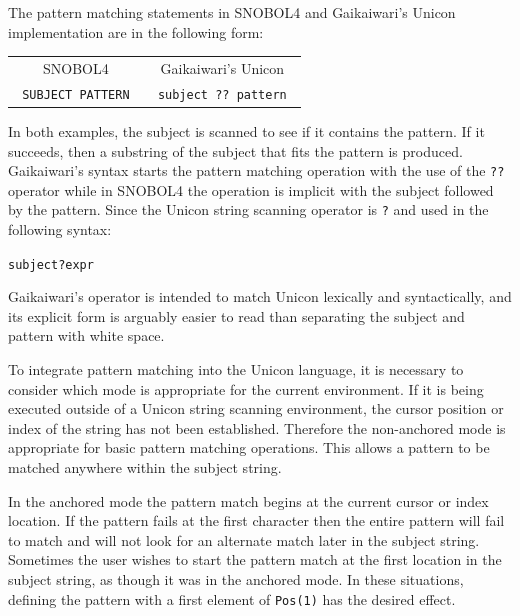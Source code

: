 \documentclass{article}
\begin{document}
\pagebreak
The pattern matching statements in SNOBOL4 and Gaikaiwari's Unicon implementation are in the following form:\\

\begin{table}[ht]
	\centering
	\begin{tabular}{c c}
		SNOBOL4 & Gaikaiwari's Unicon \\
		\texttt{ SUBJECT  PATTERN }& 
		
		\texttt{ subject ?? pattern }

	\end{tabular}
\end{table}
\noindent
In both examples, the subject is scanned to see if it contains the pattern.  If it succeeds, then a substring of the subject that fits the pattern is produced.  Gaikaiwari's syntax starts the pattern matching operation with the use of the \texttt{??} operator while in SNOBOL4 the operation is implicit with the subject followed by the pattern.  Since the Unicon string scanning operator is \texttt{?} and used in the following syntax:\\

\begin{alltt}
   subject ? expr
\end{alltt}

Gaikaiwari's operator is intended to match Unicon lexically and syntactically, and its explicit form is arguably easier to read than separating the subject and pattern with white space.   

To integrate pattern matching into the Unicon language, it is necessary to consider which mode is appropriate for the current environment.  If it is being executed outside of a Unicon string scanning environment, the cursor position or index of the string has not been established.  Therefore the non-anchored mode is appropriate for basic pattern matching operations.  This allows a pattern to be matched anywhere within the subject string.  

In the anchored mode the pattern match begins at the current cursor or index location.  If the pattern fails at the first character then the entire pattern will fail to match and will not look for an alternate match later in the subject string.  Sometimes the user wishes to start the pattern match at the first location in the subject string, as though it was in the anchored mode.  In these situations, defining the pattern with a first element of \texttt{Pos(1)} has the desired effect.
\end{document}
